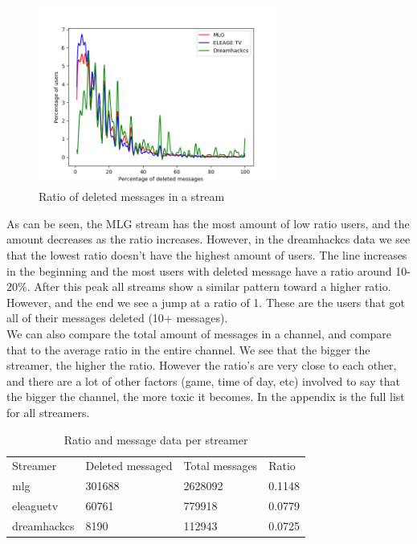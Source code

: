 \documentclass[final]{report}
\begin{document}
\begin{figure}[h]
	\centering
	\includegraphics[width=0.7\textwidth]{DeletedPerStreamer.png}
	\caption{Ratio of deleted messages in a stream}
	\label{fig:deletedPerStream}
\end{figure}

As can be seen, the MLG stream has the most amount of low ratio users, and the amount decreases as the ratio increases. However, in the dreamhackcs data we see that the lowest ratio doesn't have the highest amount of users. The line increases in the beginning and the most users with deleted message have a ratio around 10-20$\%$. After this peak all streams show a similar pattern toward a higher ratio.
However, and the end we see a jump at a ratio of 1. These are the users that got all of their messages deleted (10+ messages).\\

We can also compare the total amount of messages in a channel, and compare that to the average ratio in the entire channel. We see that the bigger the streamer, the higher the ratio. However the ratio's are very close to each other, and there are a lot of other factors (game, time of day, etc) involved to say that the bigger the channel, the more toxic it becomes. In the appendix is the full list for all streamers.

\begin{table}[]
\centering
\caption{Ratio and message data per streamer}
\label{my-label}
\begin{tabular}{l|lll}
Streamer 		 & Deleted messaged & Total messages 	& Ratio 	\\
mlg              & 301688 			& 2628092 			& 0.1148   	\\
eleaguetv        & 60761  			& 779918  			& 0.0779   	\\
dreamhackcs      & 8190   			& 112943  			& 0.0725	\\
\end{tabular}
\end{table}
\end{document}
